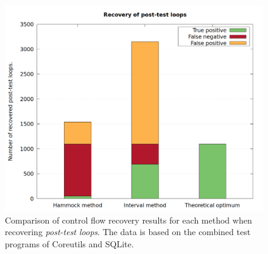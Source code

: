 \begin{figure}[htbp]
	\centering
	\includegraphics[width=\textwidth]{inc/5_results/results_post_loop.png}
	\caption{Comparison of control flow recovery results for each method when recovering \textit{post-test loops}. The data is based on the combined test programs of Coreutils and SQLite.}
	\label{fig:total_results_post_loop}
\end{figure}
